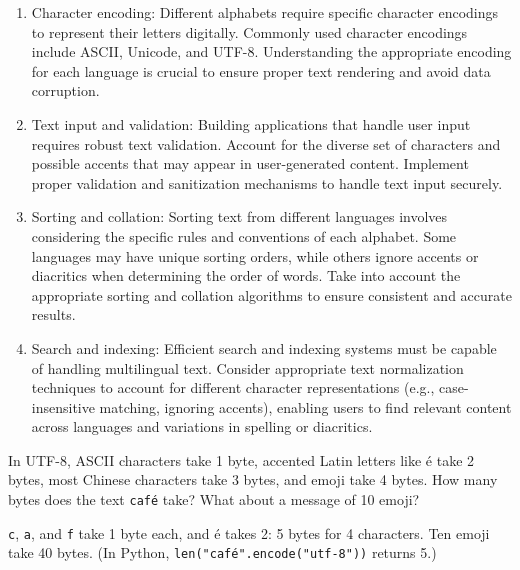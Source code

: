 \begin{enumerate}
  
\item {}Character encoding: Different alphabets require specific
  character encodings to represent their letters digitally. Commonly
  used character encodings include ASCII, Unicode, and
  UTF-8. Understanding the appropriate encoding for each language is
  crucial to ensure proper text rendering and avoid data corruption.

\item Text input and validation: Building applications that handle
  user input requires robust text validation. Account for the diverse
  set of characters and possible accents that may appear in
  user-generated content. Implement proper validation and sanitization
  mechanisms to handle text input securely.

\item {}Sorting and collation: Sorting text from different languages
  involves considering the specific rules and conventions of each
  alphabet. Some languages may have unique sorting orders, while
  others ignore accents or diacritics when determining the order of
  words. Take into account the appropriate sorting and collation
  algorithms to ensure consistent and accurate results.

\item {}Search and indexing: Efficient search and indexing systems must
  be capable of handling multilingual text. Consider appropriate text
  normalization techniques to account for different character
  representations (e.g., case-insensitive matching, ignoring accents),
  enabling users to find relevant content across languages and
  variations in spelling or diacritics.
\end{enumerate}

\begin{Exercise}[title={Counting Bytes}, label={ex:utf8}]
In UTF-8, ASCII characters take 1 byte, accented Latin letters like
\'e take 2 bytes, most Chinese characters take 3 bytes, and emoji take 4
bytes. How many bytes does the text \texttt{café} take? What about a
message of 10 emoji?
\end{Exercise}
\begin{Answer}[ref={ex:utf8}]
\texttt{c}, \texttt{a}, and \texttt{f} take 1 byte each, and \'e takes 2:
5 bytes for 4 characters. Ten emoji take 40 bytes. (In Python,
\texttt{len("café".encode("utf-8"))} returns 5.)
\end{Answer}

